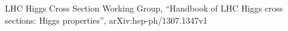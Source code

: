\begin{thebibliography}{9}

LHC Higgs Cross Section Working Group, “Handbook of LHC Higgs cross sections: Higgs properties”, arXiv:hep-ph/1307.1347v1
\label{Fritzsh}

\end{thebibliography}
